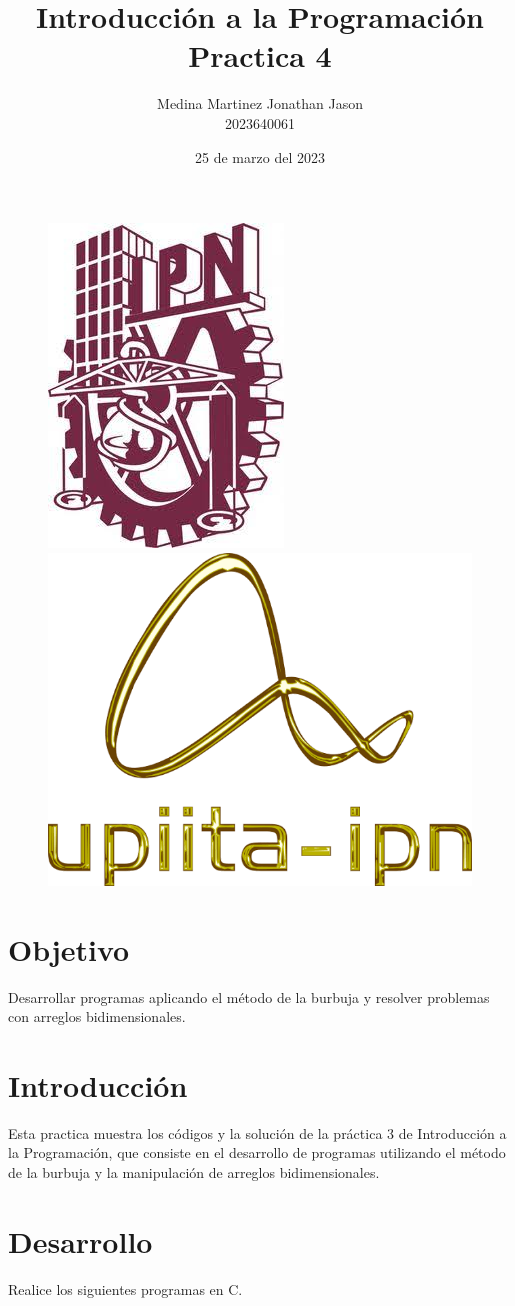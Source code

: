 \documentclass{article}
\title{Introducción a la Programación \\ Practica 4}
\author{Medina Martinez Jonathan Jason \\ 2023640061}
\date{25 de marzo del 2023}
\begin{document}

\fontsize{12}{16}\selectfont

\begin{figure}[t] %

\includegraphics[width=2.5 cm]{Logo1.jpeg}
\hfill
\includegraphics[width=3 cm]{Logo2.png}

\end{figure}

\maketitle %
\newpage

\tableofcontents %
\newpage

\section{Objetivo}

Desarrollar programas aplicando el método de la burbuja y resolver problemas con arreglos bidimensionales.

\section{Introducción}

Esta practica muestra los códigos y la solución de la práctica 3 de Introducción a la Programación, que consiste en el desarrollo de programas utilizando el método de la burbuja y la manipulación de arreglos bidimensionales.

\newpage

\section{Desarrollo}

Realice los siguientes programas en C.
\end{document}
